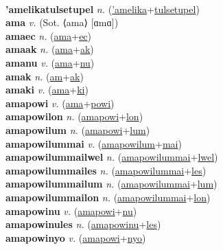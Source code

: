 \label{'amelikatecwon} \\
\textbf{'amelikatulsetupel} \textit{n.} (\hyperref['amelika]{'amelika}+\hyperref[tulsetupel]{tulsetupel})
 \label{'amelikatulsetupel} \\
\textbf{ama} \textit{v.} (Sot. ⟨ama⟩ [ɑmɑ])
 \label{ama} \\
\textbf{amaec} \textit{n.} (\hyperref[ama]{ama}+\hyperref[ec]{ec})
 \label{amaec} \\
\textbf{amaak} \textit{n.} (\hyperref[ama]{ama}+\hyperref[ak]{ak})
 \label{amaak} \\
\textbf{amanu} \textit{v.} (\hyperref[ama]{ama}+\hyperref[nu]{nu})
 \label{amanu} \\
\textbf{amak} \textit{n.} (\hyperref[am]{am}+\hyperref[ak]{ak})
 \label{amak} \\
\textbf{amaki} \textit{v.} (\hyperref[ama]{ama}+\hyperref[ki]{ki})
 \label{amaki} \\
\textbf{amapowi} \textit{v.} (\hyperref[ama]{ama}+\hyperref[powi]{powi})
 \label{amapowi} \\
\textbf{amapowilon} \textit{n.} (\hyperref[amapowi]{amapowi}+\hyperref[lon]{lon})
 \label{amapowilon} \\
\textbf{amapowilum} \textit{n.} (\hyperref[amapowi]{amapowi}+\hyperref[lum]{lum})
 \label{amapowilum} \\
\textbf{amapowilummai} \textit{v.} (\hyperref[amapowilum]{amapowilum}+\hyperref[mai]{mai})
 \label{amapowilummai} \\
\textbf{amapowilummailwel} \textit{n.} (\hyperref[amapowilummai]{amapowilummai}+\hyperref[lwel]{lwel})
 \label{amapowilummailwel} \\
\textbf{amapowilummailes} \textit{n.} (\hyperref[amapowilummai]{amapowilummai}+\hyperref[les]{les})
 \label{amapowilummailes} \\
\textbf{amapowilummailum} \textit{n.} (\hyperref[amapowilummai]{amapowilummai}+\hyperref[lum]{lum})
 \label{amapowilummailum} \\
\textbf{amapowilummailon} \textit{n.} (\hyperref[amapowilummai]{amapowilummai}+\hyperref[lon]{lon})
 \label{amapowilummailon} \\
\textbf{amapowinu} \textit{v.} (\hyperref[amapowi]{amapowi}+\hyperref[nu]{nu})
 \label{amapowinu} \\
\textbf{amapowinules} \textit{n.} (\hyperref[amapowinu]{amapowinu}+\hyperref[les]{les})
 \label{amapowinules} \\
\textbf{amapowinyo} \textit{v.} (\hyperref[amapowi]{amapowi}+\hyperref[nyo]{nyo})
